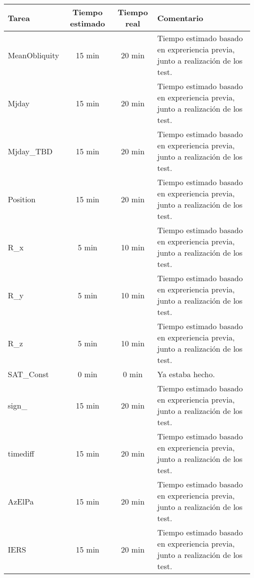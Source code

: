 \documentclass[12pt,a4paper]{article}
\begin{document}
 \begin{center}
    \begin{tabular}{|p{3cm}|c|c|p{6cm}|}
        \hline
        \textbf{Tarea} & \textbf{Tiempo estimado} & \textbf{Tiempo real} & \textbf{Comentario} \\
        \hline
        MeanObliquity & 15 min & 20 min & Tiempo estimado basado en expreriencia previa, junto a realización de los test.\\
        \hline
        Mjday & 15 min & 20 min & Tiempo estimado basado en expreriencia previa, junto a realización de los test.\\
        \hline
        Mjday\_TBD & 15 min & 20 min & Tiempo estimado basado en expreriencia previa, junto a realización de los test.\\
        \hline
        Position & 15 min & 20 min & Tiempo estimado basado en expreriencia previa, junto a realización de los test.\\
        \hline
        R\_x & 5 min & 10 min & Tiempo estimado basado en expreriencia previa, junto a realización de los test.\\
        \hline
        R\_y & 5 min & 10 min & Tiempo estimado basado en expreriencia previa, junto a realización de los test.\\
        \hline
        R\_z & 5 min & 10 min & Tiempo estimado basado en expreriencia previa, junto a realización de los test.\\
        \hline
        SAT\_Const & 0 min & 0 min & Ya estaba hecho.\\
        \hline
        sign\_ & 15 min & 20 min & Tiempo estimado basado en expreriencia previa, junto a realización de los test.\\
        \hline
        timediff & 15 min & 20 min & Tiempo estimado basado en expreriencia previa, junto a realización de los test.\\
        \hline
        AzElPa & 15 min & 20 min & Tiempo estimado basado en expreriencia previa, junto a realización de los test.\\
        \hline
        IERS & 15 min & 20 min & Tiempo estimado basado en expreriencia previa, junto a realización de los test.\\
        \hline
    \end{tabular}
 \end{center}
\end{document}
